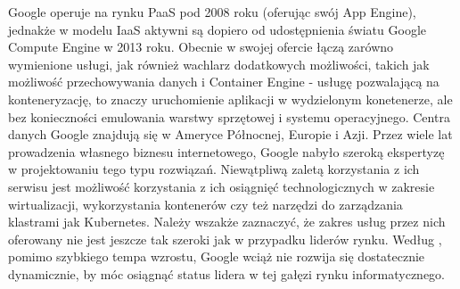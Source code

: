 \documentclass[12pt,a4paper,twoside]{article}
\begin{document}
Google operuje na rynku PaaS pod 2008 roku (oferując swój App Engine), jednakże w modelu IaaS aktywni są dopiero od udostępnienia światu Google Compute Engine w 2013 roku. Obecnie w swojej ofercie łączą zarówno wymienione usługi, jak również wachlarz dodatkowych możliwości, takich jak możliwość przechowywania danych i Container Engine - usługę pozwalającą na konteneryzację, to znaczy uruchomienie aplikacji w wydzielonym konetenerze, ale bez konieczności emulowania warstwy sprzętowej i systemu operacyjnego. Centra danych Google znajdują się w Ameryce Północnej, Europie i Azji. Przez wiele lat prowadzenia własnego biznesu internetowego, Google nabyło szeroką ekspertyzę w projektowaniu tego typu rozwiązań. Niewątpliwą zaletą korzystania z ich serwisu jest możliwość korzystania z ich osiągnięć technologicznych w zakresie wirtualizacji, wykorzystania kontenerów czy też narzędzi do zarządzania klastrami jak Kubernetes. Należy wszakże zaznaczyć, że zakres usług przez nich oferowany nie jest jeszcze tak szeroki jak w przypadku liderów rynku. Według \citet{leong2017}, pomimo szybkiego tempa wzrostu, Google wciąż nie rozwija się dostatecznie dynamicznie, by móc osiągnąć status lidera w tej gałęzi rynku informatycznego.


\clearpage
\end{document}
